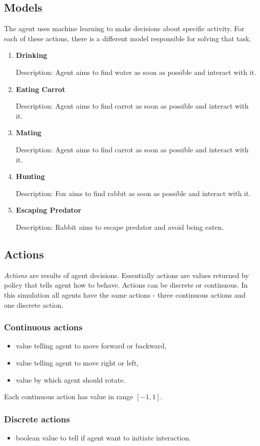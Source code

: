 \subsection{Models}
The agent uses machine learning to make decisions about specific activity. For each of these actions, there is a different model responsible for solving that task.
\begin{enumerate}
    \item \textbf{Drinking}
    \label{drinkingModel}
    
    Description: Agent aims to find water as soon as possible and interact with it.
    
    \item \textbf{Eating Carrot}
    \label{eatingCarrotModel}
    
    Description: Agent aims to find carrot as soon as possible and interact with it.
    
    \item \textbf{Mating}
    \label{matingModel}
    
    Description: Agent aims to find carrot as soon as possible and interact with it.
    
    \item \textbf{Hunting}
    \label{huntingModel}
    
    Description: Fox aims to find rabbit as soon as possible and interact with it.
    
    \item \textbf{Escaping Predator}
    \label{escapingPredatorModel}
    
    Description: Rabbit aims to escape predator and avoid being eaten.
    
\end{enumerate}

\newpage
\subsection{Actions}
\emph{Actions} are results of agent decisions. Essentially actions are values returned by policy that tells agent how to behave. Actions can be discrete or continuous. In this simulation all agents have the same actions - three continuous actions and one discrete action.

\subsubsection{Continuous actions}
\begin{itemize}
    \item value telling agent to move forward or backward,
    \item value telling agent to move right or left,
    \item value by which agent should rotate.
\end{itemize}

Each continuous action has value in range $[-1, 1]$.

\subsubsection{Discrete actions}
\begin{itemize}
    \item boolean value to tell if agent want to initiate interaction.
\end{itemize}